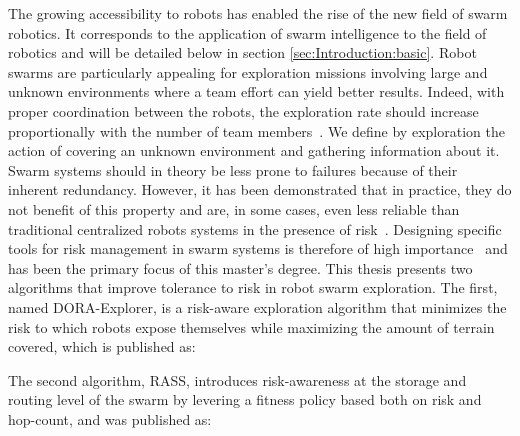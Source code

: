 
\label{sec:Introduction} 
The growing accessibility to robots has enabled the rise of the new field of swarm robotics. It corresponds to the application of swarm intelligence to the field of robotics and will be detailed below in section \ref{sec:Introduction:basic}. Robot swarms are particularly appealing for exploration missions involving large and unknown environments where a team effort can yield better results. Indeed, with proper coordination between the robots, the exploration rate should increase proportionally with the number of team members~\cite{burgard2005coordinated}. We define by exploration the action of covering an unknown environment and gathering information about it. Swarm systems should in theory be less prone to failures because of their inherent redundancy. However, it has been demonstrated that in practice, they do not benefit of this property and are, in some cases, even less reliable than traditional centralized robots systems in the presence of risk~\cite{bjerknes2013fault}. Designing specific tools for risk management in swarm systems is therefore of high importance~\cite{prorok2021beyond} and has been the primary focus of this master's degree. This thesis 
presents two algorithms that improve tolerance to risk in robot swarm exploration. The first, named \ac{DORA-Explorer}, is a risk-aware exploration algorithm that minimizes the risk to which robots expose themselves while maximizing the amount of terrain covered, which is published as: 


The second algorithm, \ac{RASS}, introduces risk-awareness at the storage and routing level of the swarm by levering a fitness policy based both on risk and hop-count, and was published as:

